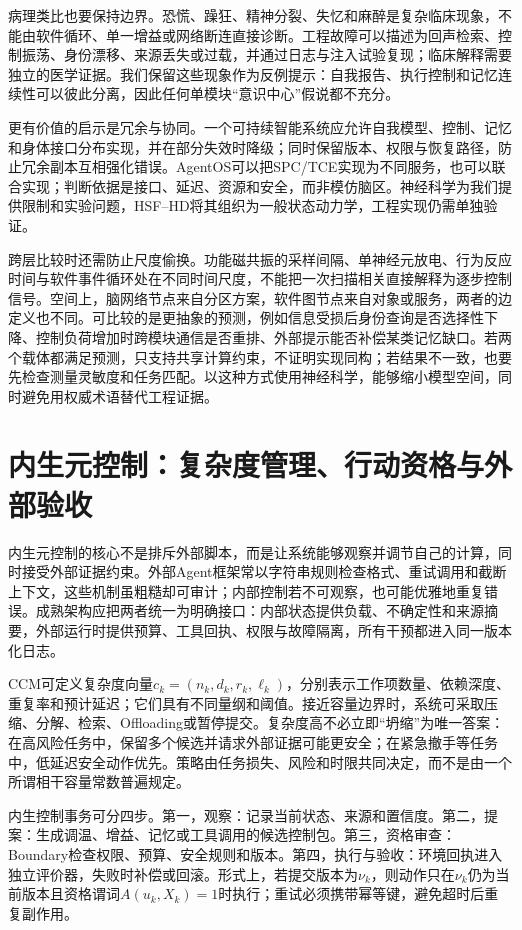 病理类比也要保持边界。恐慌、躁狂、精神分裂、失忆和麻醉是复杂临床现象，不能由软件循环、单一增益或网络断连直接诊断。工程故障可以描述为回声检索、控制振荡、身份漂移、来源丢失或过载，并通过日志与注入试验复现；临床解释需要独立的医学证据。我们保留这些现象作为反例提示：自我报告、执行控制和记忆连续性可以彼此分离，因此任何单模块“意识中心”假说都不充分。

更有价值的启示是冗余与协同。一个可持续智能系统应允许自我模型、控制、记忆和身体接口分布实现，并在部分失效时降级；同时保留版本、权限与恢复路径，防止冗余副本互相强化错误。AgentOS可以把SPC/TCE实现为不同服务，也可以联合实现；判断依据是接口、延迟、资源和安全，而非模仿脑区。神经科学为我们提供限制和实验问题，HSF--HD将其组织为一般状态动力学，工程实现仍需单独验证。

跨层比较时还需防止尺度偷换。功能磁共振的采样间隔、单神经元放电、行为反应时间与软件事件循环处在不同时间尺度，不能把一次扫描相关直接解释为逐步控制信号。空间上，脑网络节点来自分区方案，软件图节点来自对象或服务，两者的边定义也不同。可比较的是更抽象的预测，例如信息受损后身份查询是否选择性下降、控制负荷增加时跨模块通信是否重排、外部提示能否补偿某类记忆缺口。若两个载体都满足预测，只支持共享计算约束，不证明实现同构；若结果不一致，也要先检查测量灵敏度和任务匹配。以这种方式使用神经科学，能够缩小模型空间，同时避免用权威术语替代工程证据。

\section{内生元控制：复杂度管理、行动资格与外部验收}
\label{sec:endogenous_scaffolding_orthogonal_splitting}

内生元控制的核心不是排斥外部脚本，而是让系统能够观察并调节自己的计算，同时接受外部证据约束。外部Agent框架常以字符串规则检查格式、重试调用和截断上下文，这些机制虽粗糙却可审计；内部控制若不可观察，也可能优雅地重复错误。成熟架构应把两者统一为明确接口：内部状态提供负载、不确定性和来源摘要，外部运行时提供预算、工具回执、权限与故障隔离，所有干预都进入同一版本化日志。

CCM可定义复杂度向量$c_k=(n_k,d_k,r_k,\ell_k)$，分别表示工作项数量、依赖深度、重复率和预计延迟；它们具有不同量纲和阈值。接近容量边界时，系统可采取压缩、分解、检索、Offloading或暂停提交。复杂度高不必立即“坍缩”为唯一答案：在高风险任务中，保留多个候选并请求外部证据可能更安全；在紧急撤手等任务中，低延迟安全动作优先。策略由任务损失、风险和时限共同决定，而不是由一个所谓相干容量常数普遍规定。

内生控制事务可分四步。第一，观察：记录当前状态、来源和置信度。第二，提案：生成调温、增益、记忆或工具调用的候选控制包。第三，资格审查：Boundary检查权限、预算、安全规则和版本。第四，执行与验收：环境回执进入独立评价器，失败时补偿或回滚。形式上，若提交版本为$\nu_k$，则动作只在$\nu_k$仍为当前版本且资格谓词$A(u_k,X_k)=1$时执行；重试必须携带幂等键，避免超时后重复副作用。

